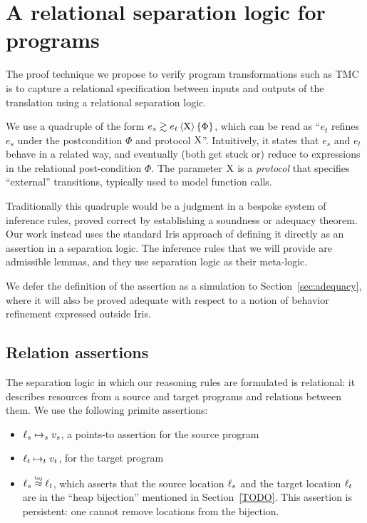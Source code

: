 \section{A relational separation logic for \LambdaLang programs}
\label{sec:reasoning_rules}

The proof technique we propose to verify program transformations such
as TMC is to capture a relational specification between inputs and
outputs of the translation using a relational separation logic.

We use a quadruple of the form $\iSim[\Chi]{\Phi}{e_s}{e_t}$, which can be read as ``$e_t$ refines $e_s$ under the postcondition $\Phi$ and protocol $\mathrm{X}$''. Intuitively, it states that $e_s$ and $e_t$ behave in a related way, and eventually (both get stuck or) reduce to expressions in the relational post-condition $\Phi$. The parameter $\mathrm{X}$ is a \emph{protocol} that specifies ``external'' transitions, typically used to model function calls.

Traditionally this quadruple would be a judgment in a bespoke system of inference rules, proved correct by establishing a soundness or adequacy theorem. Our work instead uses the standard Iris approach of defining it directly as an assertion in a separation logic. The inference rules that we will provide are admissible lemmas, and they use separation logic as their meta-logic.

We defer the definition of the assertion as a simulation to Section~\ref{sec:adequacy}, where it will also be proved adequate with respect to a notion of behavior refinement expressed outside Iris.

\subsection{Relation assertions}

The separation logic in which our reasoning rules are formulated is relational: it describes resources from a source and target programs and relations between them. We use the following primite assertions:

\begin{itemize}
\item $\ell_s \mapsto_s v_s$, a points-to assertion for the source program
\item $\ell_t \mapsto_t v_t$, for the target program
\item $\ell_s \stackrel{\scriptscriptstyle\textrm{bij}}{\approx} \ell_t$, which asserts that the source location
  $\ell_s$ and the target location $\ell_t$ are in the ``heap
  bijection'' mentioned in Section~\ref{TODO}. This assertion is
  persistent: one cannot remove locations from the bijection.
\end{itemize}

